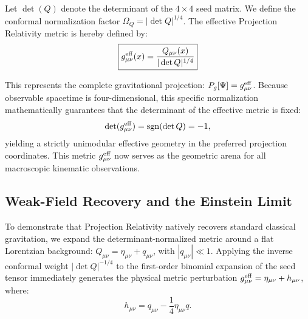 \documentclass[11pt]{article}
\begin{document}
Let $\det(Q)$ denote the determinant of the $4 \times 4$ seed matrix. We define the conformal normalization factor $\Omega_Q = |\det Q|^{1/4}$. The effective Projection Relativity metric is hereby defined by:
\begin{equation}
\boxed{ g_{\mu\nu}^{\rm eff}(x) = \frac{Q_{\mu\nu}(x)}{|\det Q|^{1/4}} }
\end{equation}

This represents the complete gravitational projection: $P_g[\Psi] = g_{\mu\nu}^{\rm eff}$. Because observable spacetime is four-dimensional, this specific normalization \cite{Einstein1919} mathematically guarantees that the determinant of the effective metric is fixed:
\begin{equation}
\det(g_{\mu\nu}^{\rm eff}) = \operatorname{sgn}(\det Q) = -1,
\end{equation}
yielding a strictly unimodular effective geometry in the preferred projection coordinates. This metric $g_{\mu\nu}^{\rm eff}$ now serves as the geometric arena for all macroscopic kinematic observations.

\subsection{Weak-Field Recovery and the Einstein Limit}
\label{sec:weak_field_expansion}

To demonstrate that Projection Relativity natively recovers standard classical gravitation, we expand the determinant-normalized metric around a flat Lorentzian \cite{carroll2004spacetime, misner1973gravitation} background: $Q_{\mu\nu} = \eta_{\mu\nu} + q_{\mu\nu}$, with $|q_{\mu\nu}| \ll 1$. Applying the inverse conformal weight $| \det Q |^{-1/4}$ to the first-order binomial expansion of the seed tensor immediately generates the physical metric perturbation $g_{\mu\nu}^{\rm eff} = \eta_{\mu\nu} + h_{\mu\nu}$, where:
\begin{equation}
h_{\mu\nu} = q_{\mu\nu} - \frac{1}{4}\eta_{\mu\nu}q.
\end{equation}
\end{document}
